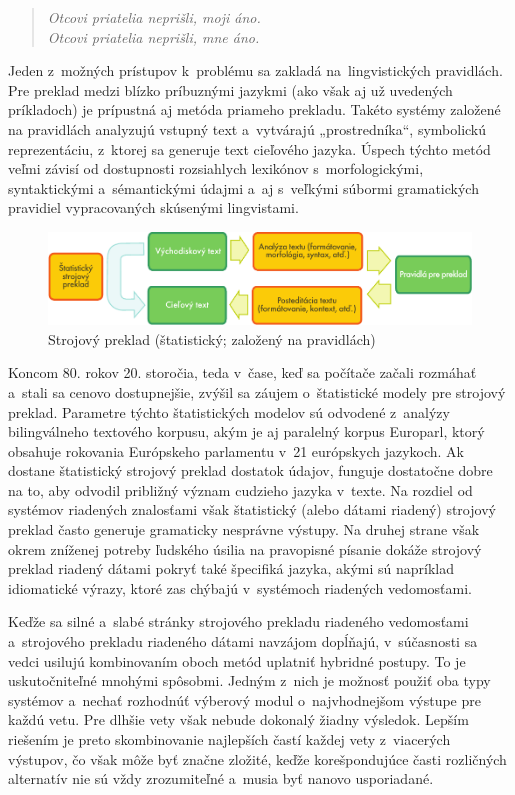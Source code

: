 \begin{multicols}{2}
\begin{verse}
\emph{Otcovi priatelia neprišli, moji áno.}\\
\smallskip
\emph{Otcovi priatelia neprišli, mne áno.}
\end{verse}

Jeden z~možných prístupov k~problému sa zakladá na~lingvistických
pravidlách. Pre preklad medzi blízko príbuznými jazykmi (ako však aj
už uvedených príkladoch) je prípustná aj metóda priameho prekladu.
Takéto systémy založené na pravidlách analyzujú vstupný text
a~vytvárajú „prostredníka“, symbolickú reprezentáciu, z~ktorej
sa generuje text cieľového jazyka. Úspech týchto metód veľmi
závisí od dostupnosti rozsiahlych lexikónov
s~morfologickými, syntaktickými a~sémantickými údajmi a~aj
s~veľkými súbormi gramatických pravidiel vypracovaných
skúsenými lingvistami. 

\begin{figure}[htb]
  \center
  \includegraphics[width=\textwidth]{../_media/slovak/machine_translation}
  \caption{Strojový preklad (štatistický; založený na pravidlách)}
  \label{fig:mtarch_sk}
\end{figure}

Koncom 80. rokov 20. storočia, teda v~čase, keď sa počítače
začali rozmáhať a~stali sa cenovo dostupnejšie, zvýšil sa záujem
o~štatistické modely pre strojový preklad. Parametre týchto
štatistických modelov sú odvodené z~analýzy bilingválneho
textového korpusu, akým je aj paralelný korpus Europarl,
ktorý obsahuje rokovania Európskeho parlamentu v~21 európskych
jazykoch. Ak dostane štatistický strojový preklad dostatok údajov,
funguje dostatočne dobre na to, aby odvodil približný význam
cudzieho jazyka v~texte. Na rozdiel od systémov riadených znalosťami
však štatistický (alebo dátami riadený) strojový preklad často
generuje gramaticky nesprávne výstupy. Na druhej strane však okrem
zníženej potreby ľudského úsilia na pravopisné písanie dokáže
strojový preklad riadený dátami pokryť také špecifiká jazyka,
akými sú napríklad idiomatické výrazy, ktoré zas chýbajú
v~systémoch riadených vedomosťami. 

Keďže sa silné a~slabé stránky strojového prekladu riadeného
vedomosťami a~strojového prekladu riadeného dátami navzájom
dopĺňajú, v~súčasnosti sa vedci usilujú kombinovaním oboch metód
uplatniť hybridné postupy. To je uskutočniteľné mnohými spôsobmi.
Jedným z~nich je možnosť použiť oba typy systémov a~nechať
rozhodnúť výberový modul o~najvhodnejšom výstupe pre každú vetu.
Pre dlhšie vety však nebude dokonalý žiadny výsledok. Lepším
riešením je preto skombinovanie najlepších častí každej vety
z~viacerých výstupov, čo však môže byť značne zložité, keďže
korešpondujúce časti rozličných alternatív nie sú vždy
zrozumiteľné a~musia byť nanovo usporiadané. 


\end{multicols}
